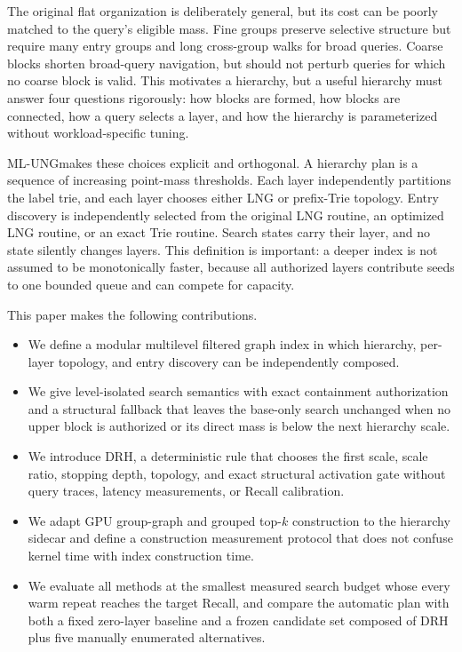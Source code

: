 \documentclass[sigconf,review,anonymous]{acmart}
\newcommand{\system}{\textsc{ML-UNG}}
\begin{document}
The original flat organization is deliberately general, but its cost can be
poorly matched to the query's eligible mass.  Fine groups preserve selective
structure but require many entry groups and long cross-group walks for broad
queries.  Coarse blocks shorten broad-query navigation, but should not perturb
queries for which no coarse block is valid.  This motivates a hierarchy, but a
useful hierarchy must answer four questions rigorously: how blocks are formed,
how blocks are connected, how a query selects a layer, and how the hierarchy is
parameterized without workload-specific tuning.

\system makes these choices explicit and orthogonal.  A hierarchy plan is a
sequence of increasing point-mass thresholds.  Each layer independently
partitions the label trie, and each layer chooses either LNG or prefix-Trie
topology.  Entry discovery is independently selected from the original LNG
routine, an optimized LNG routine, or an exact Trie routine.  Search states
carry their layer, and no state silently changes layers.  This definition is
important: a deeper index is not assumed to be monotonically faster, because
all authorized layers contribute seeds to one bounded queue and can compete
for capacity.

This paper makes the following contributions.
\begin{itemize}
  \item We define a modular multilevel filtered graph index in which hierarchy,
  per-layer topology, and entry discovery can be independently composed.
  \item We give level-isolated search semantics with exact containment
  authorization and a structural fallback that leaves the base-only search
  unchanged when no upper block is authorized or its direct mass is below the
  next hierarchy scale.
  \item We introduce DRH, a deterministic rule that chooses the first scale,
  scale ratio, stopping depth, topology, and exact structural activation gate
  without query traces, latency measurements, or Recall calibration.
  \item We adapt GPU group-graph and grouped top-$k$ construction to the
  hierarchy sidecar and define a construction measurement protocol that does not
  confuse kernel time with index construction time.
  \item We evaluate all methods at the smallest measured search budget whose
  every warm repeat reaches the target Recall, and compare the automatic plan
  with both a fixed zero-layer baseline and a frozen candidate set composed of
  DRH plus five manually enumerated alternatives.
\end{itemize}
\end{document}
